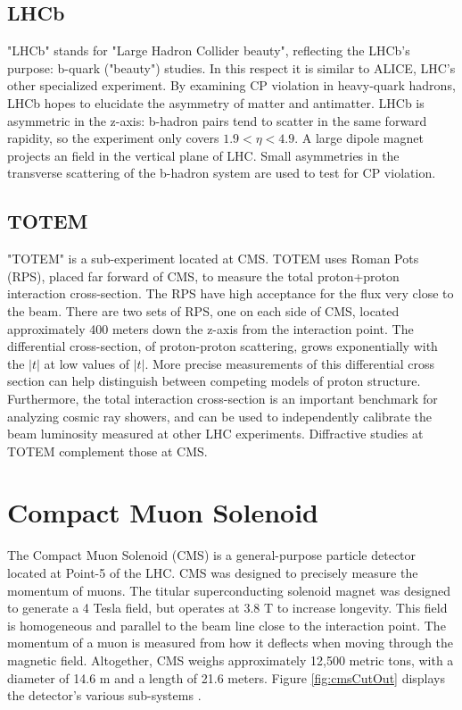 \subsection{LHCb}

"LHCb" stands for "Large Hadron Collider beauty", reflecting the LHCb's purpose: b-quark ("beauty") studies. In this respect it is similar to ALICE, LHC's other specialized experiment. By examining CP violation in heavy-quark hadrons, LHCb hopes to elucidate the asymmetry of matter and antimatter. LHCb is asymmetric in the z-axis: b-hadron pairs tend to scatter in the same forward rapidity, so the experiment only covers $1.9<\eta<4.9$. A large dipole magnet projects an field in the vertical plane of LHC. Small asymmetries in the transverse scattering of the b-hadron system are used to test for CP violation. 

\subsection{TOTEM}

"TOTEM" is a sub-experiment located at CMS. TOTEM uses Roman Pots (RPS), placed far forward of CMS, to measure the total proton+proton interaction cross-section. The RPS have high acceptance for the flux very close to the beam. There are two sets of RPS, one on each side of CMS, located approximately 400 meters down the z-axis from the interaction point. The differential cross-section, of proton-proton scattering, grows exponentially with the $|t|$ at low values of $|t|$. More precise measurements of this differential cross section can help distinguish between competing models of proton structure. Furthermore, the total interaction cross-section is an important benchmark for analyzing cosmic ray showers, and can be used to independently calibrate the beam luminosity measured at other LHC experiments. Diffractive studies at TOTEM complement those at CMS.

\section{Compact Muon Solenoid}

The Compact Muon Solenoid (CMS) is a general-purpose particle detector located at Point-5 of the LHC. CMS was designed to precisely measure the momentum of muons. The titular superconducting solenoid magnet was designed to generate a 4 Tesla field, but operates at 3.8 T to increase longevity. This field is homogeneous and parallel to the beam line close to the interaction point. The momentum of a muon is measured from how it deflects when moving through the magnetic field. Altogether, CMS weighs approximately 12,500 metric tons, with a diameter of 14.6 m and a length of 21.6 meters. Figure \ref{fig:cmsCutOut} displays the detector's various sub-systems \cite{dEnterria:2007iyi}. 

